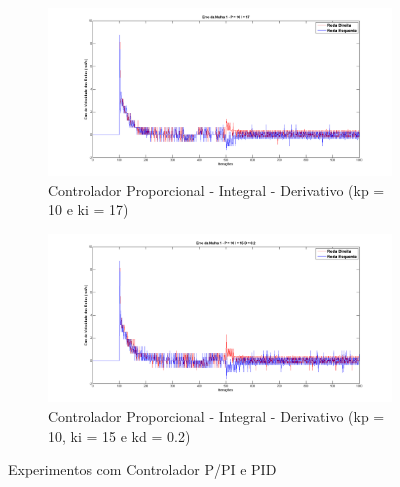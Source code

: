 \begin{figure}[!htb]
\begin{subfigure}{0.5\textwidth}
	\label{fig:contPI1}
	\end{subfigure}%
	\begin{subfigure}{0.5\textwidth}
	\centering
	\includegraphics[width=.9\linewidth]{./Testes/Malha1/PID/m1_kp10ki17}
	\caption{Controlador Proporcional - Integral - Derivativo (kp = 10 e ki = 17)}
	\label{fig:contPI2}
	\end{subfigure}
	\begin{subfigure}{1.0\textwidth}
		\centering
		\includegraphics[width=.9\linewidth]{./Testes/Malha1/PID/m1_kp10ki15kd02}
		\caption{Controlador Proporcional - Integral - Derivativo (kp = 10, ki = 15 e kd = 0.2)}
		\label{fig:contPIDP}
	\end{subfigure}
	\caption{Experimentos com Controlador P/PI e PID}
	\label{fig:contPID}
\end{figure}

